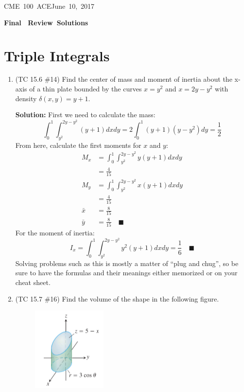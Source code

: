 \documentclass[letterpaper, 11pt]{article}
\makeatletter
\newcommand{\hmwkTitle}{Final \ Review\ Solutions} %
\newcommand{\hmwkClass}{CME\ 100\ ACE} %
\newcommand{\hmwkAuthorName}{T Anderson} %
\newcommand{\hmwkAuthorEmail}{timmya@stanford.edu} %
\makeatother
\begin{document}
\noindent
\normalsize 
\hmwkClass \hfill June\ 10,\ 2017\\

\begin{center} \Large \textbf{\hmwkTitle} \end{center}

\section{Triple Integrals}
\begin{enumerate}
\item (TC 15.6 \#14) Find the center of mass and moment of inertia about the x-axis of a thin plate bounded by the curves $x = y^2$ and $x = 2y - y^2$ with density $\delta(x,y) = y + 1$.

\par \textbf{Solution:} First we need to calculate the mass:
\[ \int_0^1 \int_{y^2}^{2y - y^2} (y+1) dxdy =2 \int_0^1 (y+1)(y - y^2) dy = \frac{1}{2} \]
From here, calculate the first moments for $x$ and $y$:
\begin{align*}
M_x &= \int_0^1 \int_{y^2}^{2y - y^2} y(y+1) dxdy \\
&= \frac{4}{15} \\
M_y &= \int_0^1 \int_{y^2}^{2y - y^2} x(y+1) dxdy \\
&= \frac{4}{15} \\
\bar x &= \frac{8}{15} \\
\bar y &= \frac{8}{15} \quad\blacksquare 
\end{align*}
For the moment of inertia:
\[ I_x = \int_0^1 \int_{y^2}^{2y - y^2} y^2(y+1) dxdy = \frac{1}{6} \quad\blacksquare \]
Solving problems such as this is mostly a matter of ``plug and chug'', so be sure to have the formulas and their meanings either memorized or on your cheat sheet. 

\item (TC 15.7 \#16) Find the volume of the shape in the following figure. 
\begin{figure}[H]
\centering \includegraphics[width=0.15\columnwidth]{finalReviewImgs/TC157_16.png}
\end{figure}


\end{enumerate}
\end{document}
